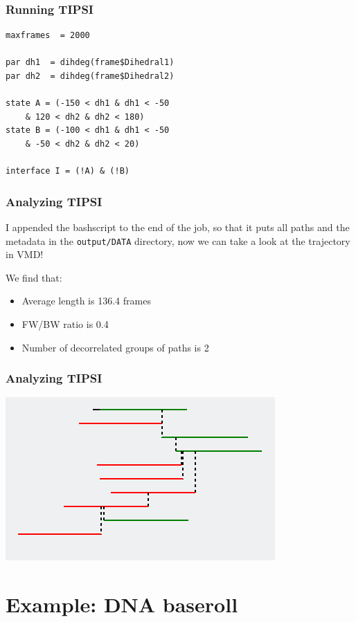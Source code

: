 \documentclass[hyperref={pdfpagelabels=false}]{beamer}
\begin{document}
\begin{frame}[fragile]
\frametitle{Running \textsc{TIPSI}} 

\begin{lstlisting}
maxframes  = 2000

par dh1  = dihdeg(frame$Dihedral1)
par dh2  = dihdeg(frame$Dihedral2)

state A = (-150 < dh1 & dh1 < -50 
	& 120 < dh2 & dh2 < 180)
state B = (-100 < dh1 & dh1 < -50 
	& -50 < dh2 & dh2 < 20)

interface I = (!A) & (!B)
\end{lstlisting}
\end{frame}

\begin{frame}
\frametitle{Analyzing \textsc{TIPSI}} 

I appended the bashscript to the end of the job, so that it puts all paths and the metadata in the \texttt{output/DATA} directory, now we can take a look at the trajectory in VMD! 

We find that:

\begin{itemize}
\item Average length is 136.4 frames
\item FW/BW ratio is 0.4
\item Number of decorrelated groups of paths is 2
\end{itemize}

\end{frame}

\begin{frame}
\frametitle{Analyzing \textsc{TIPSI}} 
\begin{center}
\includegraphics[scale=1]{images/tree.png}
\end{center}
\end{frame}

\section{Example: DNA baseroll}
\setcounter{subsection}{1}
\end{document}
